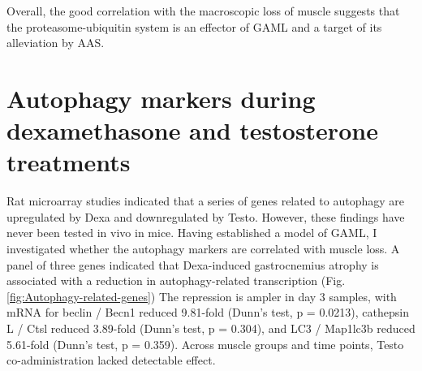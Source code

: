\documentclass[12pt,english]{report}\usepackage[]{graphicx}\usepackage[]{color}
\begin{document}
Overall, the good correlation with the macroscopic loss of muscle
suggests that the proteasome-ubiquitin system is an effector of GAML
and a target of its alleviation by AAS.


\section{Autophagy markers during dexamethasone and testosterone treatments}

Rat microarray studies indicated that a series of genes related to
autophagy are upregulated by Dexa and downregulated by Testo. However,
these findings have never been tested in vivo in mice. Having established
a model of GAML, I investigated whether the autophagy markers are
correlated with muscle loss. A panel of three genes indicated that
Dexa-induced gastrocnemius atrophy is associated with a reduction
in autophagy-related transcription (Fig. \ref{fig:Autophagy-related-genes})
The repression is ampler in day 3 samples, with mRNA for beclin /
Becn1 reduced 9.81-fold
(Dunn's test, p = 0.0213),
cathepsin L / Ctsl reduced 3.89-fold
(Dunn's test, p = 0.304),
and LC3 / Map1lc3b reduced 5.61-fold
(Dunn's test, p = 0.359).
Across muscle groups and time points, Testo co-administration lacked
detectable effect.
\end{document}
